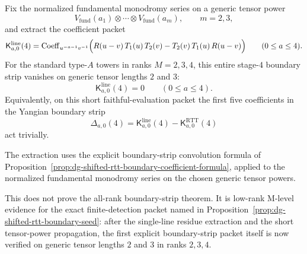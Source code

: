 \begin{computation}
\label{comp:mc4-yangian-boundary-strip-stage4}
Fix the normalized fundamental monodromy series on a generic tensor
power
\[
V_{\mathrm{fund}}(a_1)\otimes\cdots\otimes V_{\mathrm{fund}}(a_m),
\qquad m=2,3,
\]
and extract the coefficient packet
\[
\mathsf{K}^{\mathrm{line}}_{a,0}(4)
=
\operatorname{Coeff}_{u^{-a-1}v^{-1}}
\Bigl(
R(u-v)\,T_1(u)\,T_2(v)-T_2(v)\,T_1(u)\,R(u-v)
\Bigr)
\qquad (0\le a\le 4).
\]
For the standard type-$A$ towers in ranks $M=2,3,4$, this entire
stage-$4$ boundary strip vanishes on generic tensor lengths $2$ and
$3$:
\[
\mathsf{K}^{\mathrm{line}}_{a,0}(4)=0
\qquad (0\le a\le 4).
\]
Equivalently, on this short faithful-evaluation packet the first five
coefficients in the Yangian boundary strip
\[
\Delta_{a,0}(4)
=
\mathsf{K}^{\mathrm{line}}_{a,0}(4)
-\mathsf{K}^{\mathrm{RTT}}_{a,0}(4)
\]
act trivially.

The extraction uses the explicit boundary-strip convolution formula of
Proposition~\ref{prop:dg-shifted-rtt-boundary-coefficient-formula},
applied to the normalized fundamental monodromy series on the chosen
generic tensor powers.

This does not prove the all-rank boundary-strip theorem.  It is
low-rank M-level evidence for the exact finite-detection packet named
in Proposition~\ref{prop:dg-shifted-rtt-boundary-seed}: after the
single-line residue extraction and the short tensor-power propagation,
the first explicit boundary-strip packet itself is now verified on
generic tensor lengths $2$ and $3$ in ranks $2,3,4$.
\end{computation}

